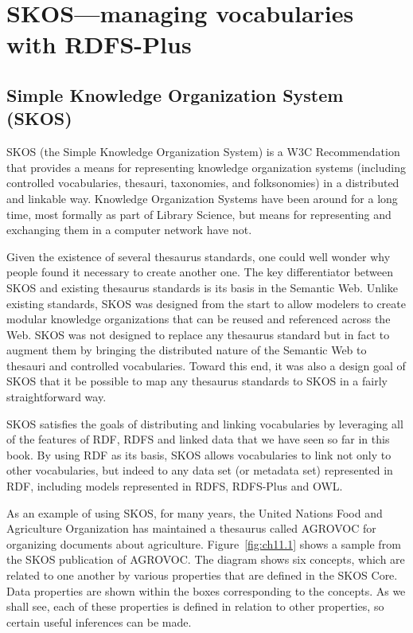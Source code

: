 \chapter{SKOS---managing vocabularies with RDFS-Plus}
\label{ch11}



\section{Simple Knowledge Organization System (SKOS)}
\label{ch11.skos}
SKOS (the Simple Knowledge Organization System) is a W3C Recommendation
that provides a means for representing knowledge organization systems
(including controlled vocabularies, thesauri, taxonomies, and
folksonomies) in a distributed and linkable way. Knowledge Organization
Systems have been around for a long time, most formally as part of
Library Science, but means for representing and exchanging them in a
computer network have not.

Given the existence of several thesaurus standards, one could well
wonder why people found it necessary to create another one. The key
differentiator between SKOS and existing thesaurus standards is its
basis in the Semantic Web. Unlike existing standards, SKOS was designed
from the start to allow modelers to create modular knowledge
organizations that can be reused and referenced across the Web. SKOS was
not designed to replace any thesaurus standard but in fact to augment
them by bringing the distributed nature of the Semantic Web to thesauri
and controlled vocabularies. Toward this end, it was also a design goal
of SKOS that it be possible to map any thesaurus standards to SKOS in a
fairly straightforward way.

SKOS satisfies the goals of distributing and linking vocabularies by leveraging
all of the features of RDF, RDFS and linked data that we have seen so far in this book. 
By using RDF as its basis, SKOS allows vocabularies to link not only to other vocabularies, but 
indeed to any data set (or metadata set) represented in RDF, including 
models represented in RDFS, RDFS-Plus and OWL. 

As an example of using SKOS, for many years, the United Nations Food and
Agriculture Organization has maintained a thesaurus called AGROVOC for
organizing documents about agriculture. Figure~\ref{fig:ch11.1} shows a sample from
the SKOS publication of AGROVOC. The diagram shows six concepts, which
are related to one another by various properties that are defined in the
SKOS Core. Data properties are shown within the boxes corresponding to
the concepts. As we shall see, each of these properties is defined in
relation to other properties, so certain useful inferences can be made.

